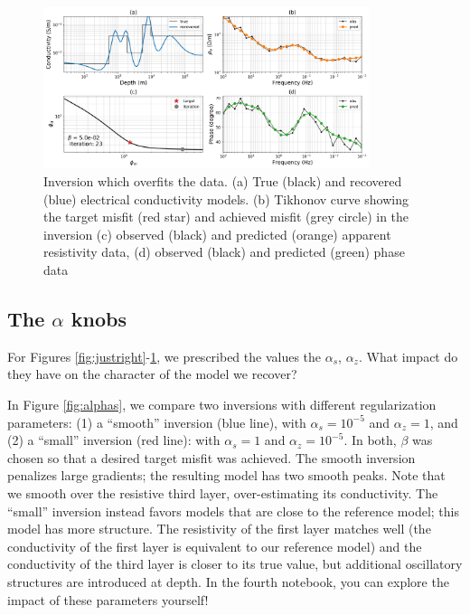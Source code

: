 \documentclass[11pt,oneside]{article}
\begin{document}
\begin{figure}[htb!]
    \centering
    \includegraphics[width=0.85\textwidth]{images/overfit.png}
\caption{Inversion which overfits the data. (a) True (black) and recovered (blue) electrical conductivity models. (b) Tikhonov curve showing the target misfit (red star) and achieved misfit (grey circle) in the inversion (c) observed (black) and predicted (orange) apparent resistivity data, (d) observed (black) and predicted (green) phase data}
\label{fig:overfit}
\end{figure}
\subsection{The $\alpha$ knobs}

For Figures \ref{fig:justright}-\ref{fig:overfit}, we prescribed the values the $\alpha_s$, $\alpha_z$. What impact do they have on the character of the model we recover?

In Figure \ref{fig:alphas}, we compare two inversions with different regularization parameters: (1) a ``smooth'' inversion (blue line), with $\alpha_s = 10^{-5}$ and $\alpha_z = 1$, and (2) a ``small'' inversion (red line): with $\alpha_s = 1$ and $\alpha_z = 10^{-5}$. In both, $\beta$ was chosen so that a desired target misfit was achieved. The smooth inversion penalizes large gradients; the resulting model has two smooth peaks. Note that we smooth over the resistive third layer, over-estimating its conductivity. The ``small'' inversion instead favors models that are close to the reference model; this model has more structure. The resistivity of the first layer matches well (the conductivity of the first layer is equivalent to our reference model) and the conductivity of the third layer is closer to its true value, but additional oscillatory structures are introduced at depth. In the fourth notebook, you can explore the impact of these parameters yourself!
\end{document}
